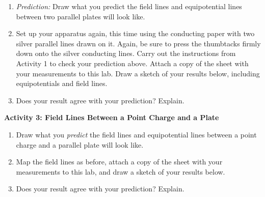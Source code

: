 \begin{enumerate}[labparts]
\item \textit{Prediction:} Draw what you predict the field lines and equipotential
lines between two parallel plates will look like.
\answerspace{1.8in}

\item Set up your apparatus again, this time using the conducting paper with two silver parallel lines drawn on it.  Again, be sure to press the thumbtacks firmly down onto the silver conducting lines.  Carry out the instructions from Activity 1 to check your prediction above.  Attach a copy of the sheet with your measurements to this lab.
Draw a sketch of your results below, including equipotentials and field lines.
\answerspace{1.8in}

\item Does your result agree with your prediction? Explain.
\answerspace{.5in}

\end{enumerate}
\textbf{Activity 3: Field Lines Between a Point Charge and a Plate}

\begin{enumerate}[labparts]

\item Draw what you \textit{predict} the field lines and equipotential
lines between a point charge and a parallel plate will look like.
\answerspace{1.8in}

\item Map the field lines as before, attach a copy of the sheet with your measurements to this lab, and draw a sketch of your results below.
\answerspace{1.8in}

\item Does your result agree with your prediction? Explain.
\answerspace{.8in}


\end{enumerate}



